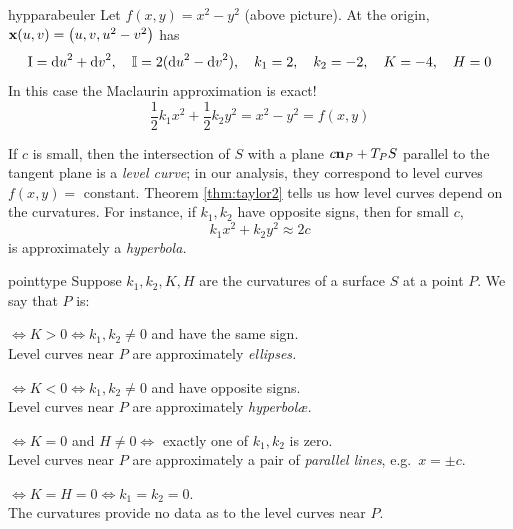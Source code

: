 \begin{example}{}{hypparabeuler}
Let $f(x,y)=x^2-y^2$ (above picture). At the origin, ${\mathbf{x}}(u,v)=\bigl(u,v,u^2-v^2\bigr)$ has
\[\mathrm{I}={\mathrm{d} u}^2+{\mathrm{d} v}^2,\quad \mathbb{I}=2({\mathrm{d} u}^2-{\mathrm{d} v}^2),\quad k_1=2,\quad k_2=-2,\quad K=-4,\quad H=0\]
In this case the Maclaurin approximation is exact!
\[\frac 12k_1x^2+\frac 12k_2y^2=x^2-y^2=f(x,y)\]
\end{example}

\goodbreak


If $c$ is small, then the intersection of $S$ with a plane $c{\mathbf{n}}_P+T_PS$ parallel to the tangent plane is a \emph{level curve}; in our analysis, they correspond to level curves $f(x,y)=$ constant. Theorem \ref{thm:taylor2} tells us how level curves depend on the curvatures. For instance, if $k_1,k_2$ have opposite signs, then for small $c$,
\[k_1x^2+k_2y^2\approx 2c\]
is approximately a \emph{hyperbola.}

\begin{defn}{}{pointtype}
Suppose $k_1,k_2,K,H$ are the curvatures of a surface $S$ at a point $P$. We say that $P$ is:
\begin{description}\itemsep0pt
	\item[\normalfont\emph{Elliptic}]\negthickspace$\iff K>0\iff k_1,k_2\neq 0$ and have the same sign.\\
  Level curves near $P$ are approximately \emph{ellipses.}
  \item[\normalfont\emph{Hyperbolic}]\negthickspace$\iff K<0\iff k_1,k_2\neq 0$ and have opposite signs.\\
  Level curves near $P$ are approximately \emph{hyperbolæ.}
  \item[\normalfont\emph{Parabolic}]\negthickspace$\iff K=0$ and $H\neq 0 \iff$ exactly one of $k_1,k_2$ is zero.\\
  Level curves near $P$ are approximately a pair of \emph{parallel lines}, e.g.\ $x=\pm c$.
  \item[\normalfont\emph{Planar}]\negthickspace$\iff K=H=0\iff k_1=k_2=0$.\\
  The curvatures provide no data as to the level curves near $P$.
\end{description}
\end{defn}


